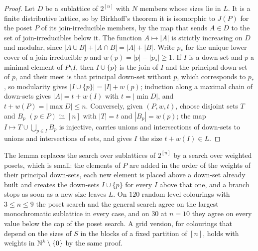 \begin{proof}
Let $D$ be a sublattice of $2^{[n]}$ with $N$ members whose sizes lie in $L$. It is a finite distributive lattice, so by Birkhoff's theorem it is isomorphic to $J(P)$ for the poset $P$ of its join-irreducible members, by the map that sends $A\in D$ to the set of join-irreducibles below it. The function $A\mapsto|A|$ is strictly increasing on $D$ and modular, since $|A\cup B|+|A\cap B|=|A|+|B|$. Write $p_{*}$ for the unique lower cover of a join-irreducible $p$ and $w(p)=|p|-|p_{*}|\ge1$. If $I$ is a down-set and $p$ a minimal element of $P\setminus I$, then $I\cup\{p\}$ is the join of $I$ and the principal down-set of $p$, and their meet is that principal down-set without $p$, which corresponds to $p_{*}$, so modularity gives $|I\cup\{p\}|=|I|+w(p)$; induction along a maximal chain of down-sets gives $|A|=t+w(I)$ with $t=|\min D|$, and $t+w(P)=|\max D|\le n$. Conversely, given $(P,w,t)$, choose disjoint sets $T$ and $B_{p}$ $(p\in P)$ in $[n]$ with $|T|=t$ and $|B_{p}|=w(p)$; the map $I\mapsto T\cup\bigcup_{p\in I}B_{p}$ is injective, carries unions and intersections of down-sets to unions and intersections of sets, and gives $I$ the size $t+w(I)\in L$.
\end{proof}

The lemma replaces the search over sublattices of $2^{[n]}$ by a search over weighted posets, which is small: the elements of $P$ are added in the order of the weights of their principal down-sets, each new element is placed above a down-set already built and creates the down-sets $I\cup\{p\}$ for every $I$ above that one, and a branch stops as soon as a new size leaves $L$. On $120$ random level colourings with $3\le n\le9$ the poset search and the general search agree on the largest monochromatic sublattice in every case, and on $30$ at $n=10$ they agree on every value below the cap of the poset search. A grid version, for colourings that depend on the sizes of $S$ in the blocks of a fixed partition of $[n]$, holds with weights in $\mathbb{N}^{k}\setminus\{0\}$ by the same proof.


